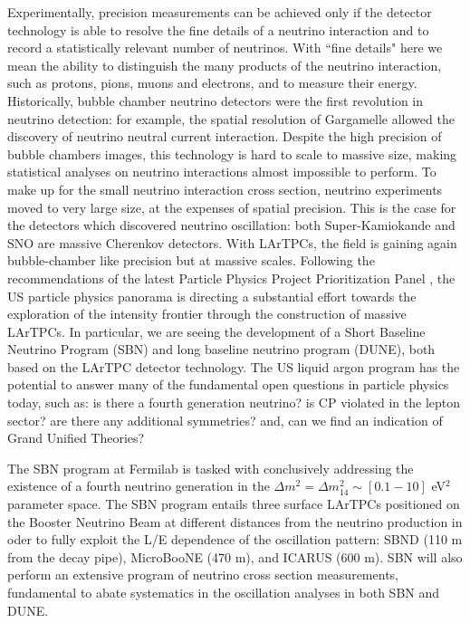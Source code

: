 Experimentally, precision measurements can be achieved only if the detector technology is able to resolve the fine details of a neutrino interaction and to record a statistically relevant number of neutrinos.  With ``fine details" here we mean the ability to distinguish the many products of the neutrino interaction, such as protons, pions, muons and electrons, and to measure their energy.
Historically,  bubble chamber neutrino detectors were the first revolution in neutrino detection: for example, the spatial resolution of Gargamelle allowed the discovery of neutrino neutral current interaction\cite{HASERT1973138}. Despite the high precision of bubble chambers images, this technology is hard to scale to massive size, making statistical analyses on neutrino interactions almost impossible to perform. To make up for the small neutrino interaction cross section, neutrino experiments moved to very large size, at the expenses of spatial precision. This is the case for the detectors which discovered neutrino oscillation:  both Super-Kamiokande and SNO are massive Cherenkov detectors. With LArTPCs, the field is gaining again bubble-chamber like precision but at massive scales. Following the recommendations of  the latest Particle Physics Project Prioritization Panel  \cite{P5}, the US particle physics panorama is directing a substantial effort towards the exploration of the intensity frontier through the construction of massive LArTPCs. In particular, we are seeing the development of a Short Baseline Neutrino Program (SBN) and long baseline neutrino program  (DUNE), both based on the LArTPC detector technology. The US liquid argon program has the potential to answer many of the fundamental open questions in particle physics today, such as: is there a fourth generation neutrino? is CP violated in the lepton sector? are there any additional symmetries? and, can we find an indication of Grand Unified Theories? 

The SBN program at Fermilab is tasked with conclusively addressing the existence of a fourth neutrino generation in the  $\Delta m^2= \Delta m^2_{14} \sim [0.1 - 10]$ eV$^2$ parameter space. The SBN program entails three surface LArTPCs positioned on the Booster Neutrino Beam at different distances from the neutrino production in oder to fully exploit  the L/E dependence of the oscillation pattern:  SBND (110 m from the decay pipe), MicroBooNE (470 m), and ICARUS (600 m). SBN will also perform an extensive 
program of neutrino cross section measurements, fundamental to abate systematics in the oscillation analyses in both SBN and DUNE.

